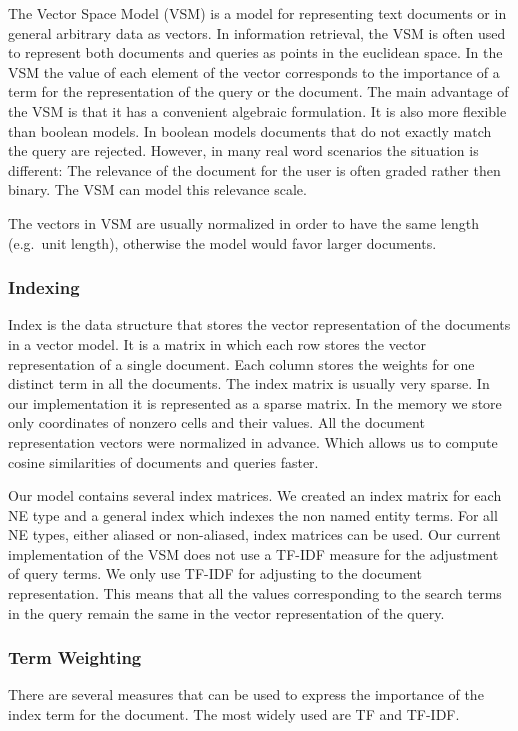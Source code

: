 The Vector Space Model (VSM) is a model for representing text documents or in general arbitrary data as vectors. In information retrieval, the VSM is often used to represent both documents and queries as points in the euclidean space. In the VSM the value of each element of the vector corresponds to the importance of a term for the representation of the query or the document. The main advantage of the VSM is that it has a convenient algebraic formulation. It is also more flexible than boolean models. In boolean models documents that do not exactly match the query are rejected. However, in many real word scenarios the situation is different: The relevance of the document for the user is often graded rather then binary. The VSM can model this relevance scale.

The vectors in VSM are usually normalized in order to have the same length (e.g.\ unit length), otherwise the model would favor larger documents.

\subsubsection{Indexing}
\label{sec:indexing}
Index is the data structure that stores the vector representation of the documents in a vector model. It is a matrix in which each row stores the vector representation of a single document. Each column stores the weights for one distinct term in all the documents. The index matrix is usually very sparse. In our implementation it is represented as a sparse matrix. In the memory we store only coordinates of nonzero cells and their values. All the document representation vectors were normalized in advance. Which allows us to compute cosine similarities of documents and queries faster.

Our model contains several index matrices. We created an index matrix for each NE type and a general index which indexes the non named entity terms. For all NE types, either aliased or non-aliased, index matrices can be used. Our current implementation of the VSM does not use a TF-IDF measure for the adjustment of query terms. We only use TF-IDF for adjusting to the document representation. This means that all the values corresponding to the search terms in the query remain the same in the vector representation of the query.

\subsubsection{Term Weighting}
\label{sec:term_weighting}
There are several measures that can be used to express the importance of the index term for the document. The most widely used are TF and TF-IDF.

